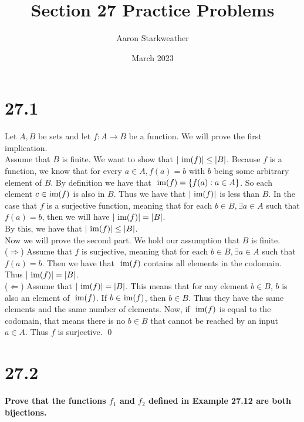 \documentclass{article}
\title{Section 27 Practice Problems}
\author{Aaron Starkweather}
\date{March 2023}
\begin{document}
\maketitle

\newpage

\section*{27.1}
\proof Let $A, B$ be sets and let $f: A \rightarrow B$ be a function. We will prove the first implication.\\
\indent Assume that $B$ is finite. We want to show that $|\im{f}| \leq |B|$. Because $f$ is a function, we know that for every $a \in A, f(a) = b$ with $b$ being some arbitrary element of $B$. By definition we have that $\im{f} = \{f(a) : a \in A\}$. So each element $c \in \im{f}$ is also in $B$. Thus we have that $|\im{f}|$ is less than $B$. In the case that $f$ is a surjective function, meaning that for each $b \in B, \exists a \in A$ such that $f(a) = b$, then we will have $|\im{f}| = |B|$.\\
By this, we have that $|\im{f}| \leq |B|$.\\
\indent Now we will prove the second part. We hold our assumption that $B$ is finite.\\
($\Rightarrow$) Assume that $f$ is surjective, meaning that for each $b \in B, \exists a \in A$ such that $f(a) = b$. Then we have that $\im{f}$ contains all elements in the codomain. Thus $|\im{f}| = |B|$.\\
($\Leftarrow$) Assume that $|\im{f}| = |B|$. This means that for any element $b \in B$, $b$ is also an element of $\im{f}$. If $b \in \im{f}$, then $b \in B$. Thus they have the same elements and the same number of elements. Now, if $\im{f}$ is equal to the codomain, that means there is no $b \in B$ that cannot be reached by an input $a \in A$. Thus $f$ is surjective. \qed

\section*{27.2}
\textbf{Prove that the functions $f_1$ and $f_2$ defined in Example 27.12 are both bijections.}\\
\end{document}

